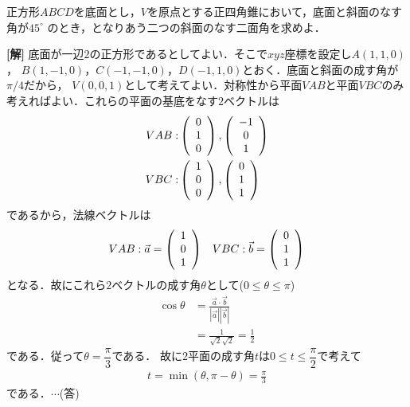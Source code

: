 \documentclass[a4j]{jarticle}
\begin{document}

     \begin{oframed}
     正方形$ABCD$を底面とし，$V$を原点とする正四角錐において，底面と斜面のなす角が$45^\circ$
     のとき，となりあう二つの斜面のなす二面角を求めよ．
     \end{oframed}

\setlength{\columnseprule}{0.4pt}
\begin{multicols}{2}
{\bf[解]} 底面が一辺$2$の正方形であるとしてよい．そこで$xyz$座標を設定し$A(1,1,0)$，
$B(1,-1,0)$，$C(-1,-1,0)$，$D(-1,1,0)$とおく．底面と斜面の成す角が$\pi/4$だから，
$V(0,0,1)$として考えてよい．対称性から平面$VAB$と平面$VBC$のみ考えればよい．これらの平面の基底をなす$2$ベクトルは
     \begin{align*}
     VAB:&\left( \begin{array}{c} 0 \\ 1 \\ 0 \\ \end{array} \right) , \left( \begin{array}{c} -1 \\ 0 \\ 1 \\ \end{array} \right)  \\
     VBC:&\left( \begin{array}{c} 1 \\ 0 \\ 0 \\ \end{array} \right) , \left( \begin{array}{c} 0 \\ 1 \\ 1 \\ \end{array} \right) 
     \end{align*}
であるから，法線ベクトルは
     \begin{align*}
     &VAB:\vec{a}=\left( \begin{array}{c} 1 \\ 0 \\ 1 \\ \end{array} \right) &VBC:\vec{b}=\left( \begin{array}{c} 0 \\ 1 \\ 1 \\ \end{array} \right)
     \end{align*}
となる．故にこれら$2$ベクトルの成す角$\theta$として($0\le\theta\le\pi$)
     \begin{align*}
     \cos\theta&=\frac{\vec{a}\cdot\vec{b}}{|\vec{a}||\vec{b}|} \\
     &=\frac{1}{\sqrt{2}\sqrt{2}}=\frac{1}{2}
     \end{align*}
である．従って$\theta=\dfrac{\pi}{3}$である．
故に$2$平面の成す角$t$は$0\le t\le\dfrac{\pi}{2}$で考えて
     \begin{align*}
     t=\min(\theta,\pi-\theta)=\frac{\pi}{3}
     \end{align*}
である．$\cdots$(答)
     
     
\newpage
\end{multicols}
\end{document}
